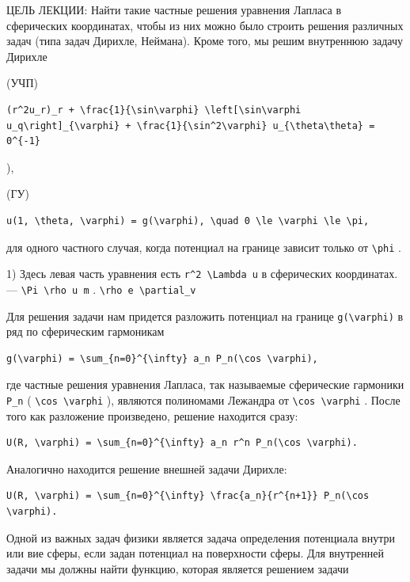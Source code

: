 \documentclass[
  ukrainian,
]{article}
\begin{document}
ЦЕЛЬ ЛЕКЦИИ: Найти такие частные решения уравнения Лапласа в сферических
координатах, чтобы из них можно было строить решения различных задач
(типа задач Дирихле, Неймана). Кроме того, мы решим внутреннюю задачу
Дирихле

(УЧП)

\begin{verbatim}
(r^2u_r)_r + \frac{1}{\sin\varphi} \left[\sin\varphi u_q\right]_{\varphi} + \frac{1}{\sin^2\varphi} u_{\theta\theta} = 0^{-1}
\end{verbatim}

),

(ГУ)

\begin{verbatim}
u(1, \theta, \varphi) = g(\varphi), \quad 0 \le \varphi \le \pi,
\end{verbatim}

для одного частного случая, когда потенциал на границе зависит только от
\texttt{\textbackslash{}phi} .

1) Здесь левая часть уравнения есть
\texttt{r\^{}2\ \textbackslash{}Lambda\ u} в сферических координатах.---
\texttt{\textbackslash{}Pi\ \textbackslash{}rho\ u\ m} .
\texttt{\textbackslash{}rho\ e\ \textbackslash{}partial\_v}

Для решения задачи нам придется разложить потенциал на границе
\texttt{g(\textbackslash{}varphi)} в ряд по сферическим гармоникам

\begin{verbatim}
g(\varphi) = \sum_{n=0}^{\infty} a_n P_n(\cos \varphi),
\end{verbatim}

где частные решения уравнения Лапласа, так называемые сферические
гармоники \texttt{P\_n} (
\texttt{\textbackslash{}cos\ \textbackslash{}varphi} ), являются
полиномами Лежандра от
\texttt{\textbackslash{}cos\ \textbackslash{}varphi} . После того как
разложение произведено, решение находится сразу:

\begin{verbatim}
U(R, \varphi) = \sum_{n=0}^{\infty} a_n r^n P_n(\cos \varphi).
\end{verbatim}

Аналогично находится решение внешней задачи Дирихле:

\begin{verbatim}
U(R, \varphi) = \sum_{n=0}^{\infty} \frac{a_n}{r^{n+1}} P_n(\cos \varphi).
\end{verbatim}

Одной из важных задач физики является задача определения потенциала
внутри или вие сферы, если задан потенциал на поверхности сферы. Для
внутренней задачи мы должны найти функцию, которая является решением
задачи
\end{document}
